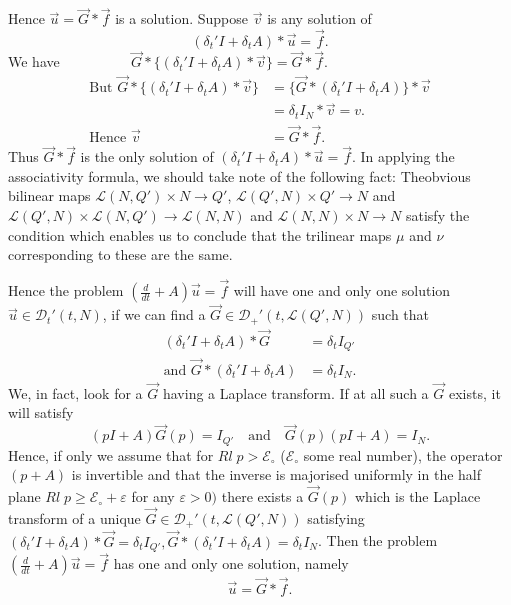 \noindent Hence $\overrightarrow{u} = \overrightarrow{G} *
\overrightarrow{f}$ is a solution. Suppose $\overrightarrow{v}$ is any
solution of 
$$
(\delta_t' I + \delta_t A) * \overrightarrow{u} = \overrightarrow{f}.
$$
We have $\hspace{2cm} \overrightarrow{G}* \{(\delta_t' I + \delta_t A) *
\overrightarrow{v}\} = \overrightarrow{G}* \overrightarrow{f}$. 
\begin{align*}
\text{But } \overrightarrow{G}* \{(\delta_t' I + \delta_t A)
* \overrightarrow{v}\} &= \{\overrightarrow{G}*(\delta_t' I + \delta_t A)\}
*\overrightarrow{v}\\
&= \delta_t I_N * \overrightarrow{v} = v.\\
\text{Hence }  \overrightarrow{v} &= \overrightarrow{G} *
\overrightarrow{f}.
\end{align*}
Thus $\overrightarrow{G} * \overrightarrow{f}$ is the only solution of
$(\delta_t' I + \delta_t A) * \overrightarrow{u} =
\overrightarrow{f}$. In applying the associativity formula, we should
take note of the following fact: The\pageoriginale obvious bilinear
maps $\mathscr{L}(N, Q')\times N \to Q'$, $\mathscr{L}(Q', N) \times
Q' \to N$ and $\mathscr{L}(Q', N) \times \mathscr{L}(N, Q') \to
\mathscr{L}(N, N)$ and $\mathscr{L}(N, N) \times N \to N$ satisfy the
condition which enables us to conclude that the trilinear maps $\mu$
and $\nu$ corresponding to these are the same. 

Hence the problem $(\frac{d}{dt} + A) \overrightarrow{u} =
\overrightarrow{f}$ will have one and only one solution
$\overrightarrow{u} \in \mathscr{D}_t'(t, N)$, if we can find a
$\overrightarrow{G} \in \mathscr{D}_+' (t, \mathscr{L}(Q', N))$ such
that 
\begin{align*}
(\delta_t' I + \delta_t A) * \overrightarrow{G} &= \delta_t I_{Q'}\\
\text{and }  \overrightarrow{G} * (\delta_t' I + \delta_t
A) &= \delta_t I_N.
\end{align*}
We, in fact, look for a $\overrightarrow{G}$ having a Laplace
transform. If at all such a $\overrightarrow{G}$ exists, it will
satisfy
$$
(pI + A) \overrightarrow{G} (p) = I_{Q'} \quad \text{and} \quad
\overrightarrow{G}(p) (pI + A) = I_N.
$$
Hence, if only we assume that for $Rl \; p> \mathscr{E}_\circ$
($\mathscr{E}_\circ$ some real number), the operator $(p+A)$ is
invertible and that the inverse is majorised uniformly in the half
plane $Rl\; p\geq \mathscr{E}_\circ + \varepsilon$ for any
$\varepsilon > 0)$ there exists a $\overrightarrow{G}(p)$ which is the
Laplace transform of a unique $\overrightarrow{G} \in \mathscr{D}_+'
(t, \mathscr{L}(Q', N))$ satisfying $(\delta_t' I + \delta_t A) *
\overrightarrow{G}=\delta_t I_{Q'},\overrightarrow{G}*(\delta_t' I +\delta_t A)=
\delta_t I_N$. Then the problem $(\frac{d}{dt} + A) \overrightarrow{u}
= \overrightarrow{f}$ has one and only one solution, namely
$$
\overrightarrow{u} = \overrightarrow{G} * \overrightarrow{f}.
$$  
